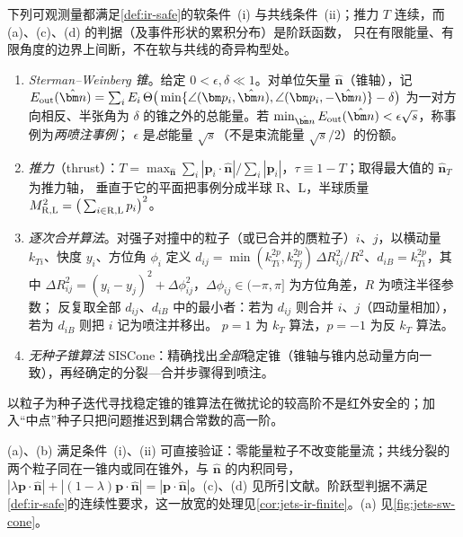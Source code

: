 \begin{definition}[红外安全的喷注定义与事件形状]\label{def:jets-algorithms}
下列可观测量都满足\cref{def:ir-safe}的软条件~(i) 与共线条件~(ii)；推力 $T$ 连续，而 (a)、(c)、(d) 的判据（及事件形状的累积分布）是阶跃函数，
只在有限能量、有限角度的边界上间断，不在软与共线的奇异构型处。
\begin{enumerate}[label=(\alph*),leftmargin=2.2em,itemsep=1pt,topsep=2pt]
\item \emph{Sterman--Weinberg 锥}\cite{StermanWeinberg1977}。给定 $0<\epsilon,\delta\ll1$。对单位矢量 $\hat{\bm n}$（锥轴），记
$E_{\rm out}(\hat{\bm n})=\sum_iE_i\,\Theta\big(\min\{\angle(\bm p_i,\hat{\bm n}),\angle(\bm p_i,-\hat{\bm n})\}-\delta\big)$
为一对方向相反、半张角为 $\delta$ 的锥之外的总能量。若 $\min_{\hat{\bm n}}E_{\rm out}(\hat{\bm n})<\epsilon\sqrt s$，称事例为\emph{两喷注事例}；
$\epsilon$ 是\emph{总}能量 $\sqrt s$（不是束流能量 $\sqrt s/2$）的份额。
\item \emph{推力}（thrust）\cite{Farhi1977}：$T=\max_{\hat{\bm n}}\sum_i|\bm p_i\cdot\hat{\bm n}|/\sum_i|\bm p_i|$，$\tau\equiv1-T$；取得最大值的 $\hat{\bm n}_T$ 为推力轴，
垂直于它的平面把事例分成半球 R、L，半球质量 $M_{\rm R,L}^2=\big(\sum_{i\in\mathrm{R,L}}p_i\big)^2$。
\item \emph{逐次合并算法}。对强子对撞中的粒子（或已合并的赝粒子）$i$、$j$，以横动量 $k_{Ti}$、快度 $y_i$、方位角 $\phi_i$ 定义
$d_{ij}=\min(k_{Ti}^{2p},k_{Tj}^{2p})\,\Delta R_{ij}^2/R^2$、$d_{iB}=k_{Ti}^{2p}$，其中 $\Delta R_{ij}^2=(y_i-y_j)^2+\Delta\phi_{ij}^2$，$\Delta\phi_{ij}\in(-\pi,\pi]$ 为方位角差，$R$ 为喷注半径参数；
反复取全部 $d_{ij}$、$d_{iB}$ 中的最小者：若为 $d_{ij}$ 则合并 $i$、$j$（四动量相加），若为 $d_{iB}$ 则把 $i$ 记为喷注并移出。
$p=1$ 为 $k_T$ 算法\cite{CataniEtAl1993kt,EllisSoper1993}，$p=-1$ 为反 $k_T$ 算法\cite{CacciariSalamSoyez2008}。
\item \emph{无种子锥算法} SISCone\cite{SalamSoyez2007}：精确找出\emph{全部}稳定锥（锥轴与锥内总动量方向一致），再经确定的分裂—合并步骤得到喷注。
\end{enumerate}
以粒子为种子迭代寻找稳定锥的锥算法在微扰论的较高阶不是红外安全的；加入“中点”种子只把问题推迟到耦合常数的高一阶\cite{SalamSoyez2007}。
\end{definition}

(a)、(b) 满足条件~(i)、(ii) 可直接验证：零能量粒子不改变能量流；共线分裂的两个粒子同在一锥内或同在锥外，与 $\hat{\bm n}$ 的内积同号，
$|\lambda\bm p\cdot\hat{\bm n}|+|(1-\lambda)\bm p\cdot\hat{\bm n}|=|\bm p\cdot\hat{\bm n}|$。(c)、(d) 见所引文献。阶跃型判据不满足\cref{def:ir-safe}的连续性要求，这一放宽的处理见\cref{cor:jets-ir-finite}。(a) 见\cref{fig:jets-sw-cone}。


